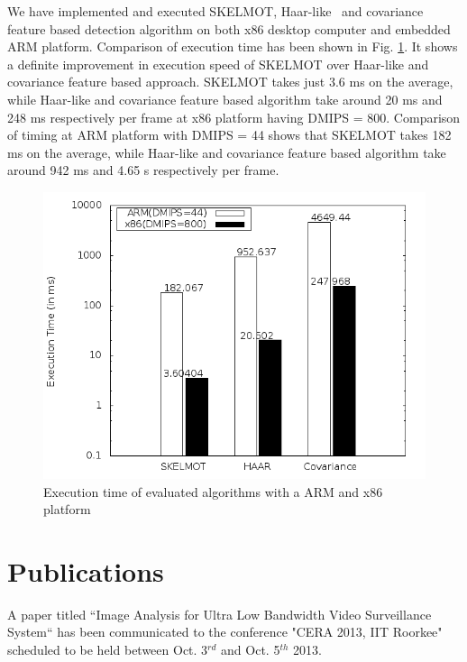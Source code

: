 \documentclass[a4paper, 12pt, twoside]{synopsis}  %
\begin{document}
\indent We have implemented and executed SKELMOT, Haar-like~\cite{17} and
covariance~\cite{19} feature based detection algorithm on both x86
desktop computer and embedded ARM platform. Comparison of execution time
has been shown in Fig.  \ref{pipeline_execution_time}. It shows a
definite improvement in execution speed of SKELMOT over Haar-like and
covariance feature based approach.  SKELMOT takes just 3.6 ms on the
average, while Haar-like and covariance feature based algorithm take
around 20 ms and 248 ms respectively per frame at x86 platform having
DMIPS = 800. Comparison of timing at ARM platform with DMIPS = 44 shows
that SKELMOT takes 182 ms on the average, while Haar-like and covariance
feature based algorithm take around 942 ms and 4.65 s respectively per
frame.  \\
\begin{figure}[!t]
\centering
\includegraphics[scale=0.50]{Figures/pipeline_execution_time}
\caption{Execution time of evaluated algorithms with a ARM and x86
platform}
\label{pipeline_execution_time}
\end{figure}
\section {Publications}
\indent A paper titled ``Image Analysis for Ultra Low Bandwidth Video
Surveillance System`` has been communicated to the conference "CERA
2013, IIT Roorkee" scheduled to be held between Oct. 3$^{rd}$ and
Oct. 5$^{th}$ 2013.\\
  \clearpage

\label{Bibliography}
%
\end{document}
